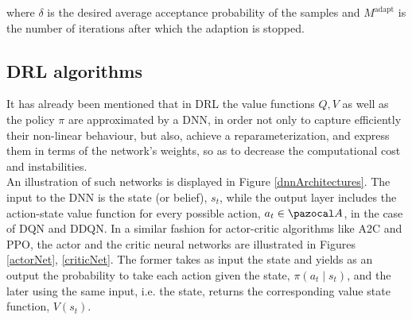 \vspace{0.5cm}

where $\delta$ is the desired average acceptance probability of the samples and $M^{\text{adapt}}$ is the number of iterations after which the adaption is stopped.


\newpage


\subsection{\acrfull{DRL} algorithms}

It has already been mentioned that in \gls{DRL} the value functions $Q, V$ as well as the policy $\pi$ are approximated by a \gls{DNN}, in order not only to capture efficiently their non-linear behaviour, but also, achieve a reparameterization, and express them in terms of the network's weights, so as to decrease the computational cost and instabilities.\\

An illustration of such networks is displayed in Figure \ref{dnnArchitectures}. The input to the \gls{DNN} is the state (or belief\footnotemark), $s_t$, while the output layer includes the action-state value function for every possible action, $a_t \in \ccal{A}$, in the case of \gls{DQN} and \gls{DDQN}. In a similar fashion for actor-critic algorithms like \gls{A2C} and \gls{PPO}, the actor and the critic neural networks are illustrated in Figures \ref{actorNet}, \ref{criticNet}. The former takes as input the state and yields as an output the probability to take each action given the state, $\pi(a_t \mid s_t)$, and the later using the same input, i.e. the state, returns the corresponding value state function, $V(s_t)$.\\


